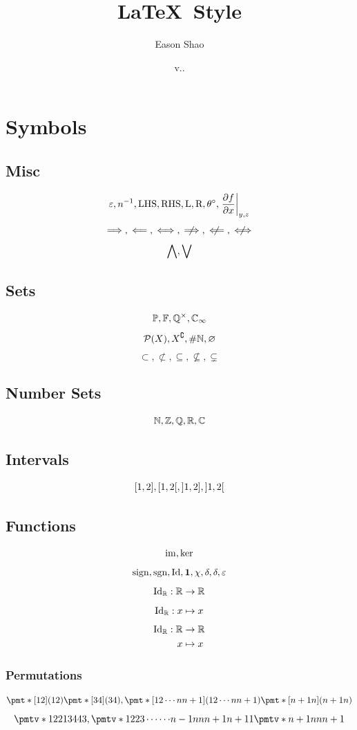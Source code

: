 \documentclass{article}
\title{\LaTeX\ Style}
\author{Eason Shao}
\date{v.\DATE.\COMMITSHA}
\begin{document}
\maketitle

\section{Symbols}
\subsection{Misc}
\[
    \varepsilon, n^{-1}, \text{LHS}, \text{RHS}, \text{L}, \text{R}, \theta^{\circ}, \left.\pdv{f}{x}\right\rvert_{y, z}
\]
\[
    \implies, \impliedby, \iff, \notimplies, \notimpliedby, \notiff
\]
\[
    \bigwedge, \bigvee
\]

\subsection{Sets}
\[
    \mathbb{P}, \mathbb{F}, \mathbb{Q}^{\times}, \mathbb{C}_{\infty}
\]
\[
    \powerset\pqty{X}, X\compl, \size\NN, \emptyset
\]
\[
    \subset, \nsubset, \subseteq, \nsubseteq, \subsetneq
\]

\subsection{Number Sets}
\[
    \mathbb{N}, \mathbb{Z}, \mathbb{Q}, \mathbb{R}, \mathbb{C}
\]

\subsection{Intervals}
\[
    \ccintv{1}{2}, \cointv{1}{2}, \ocintv{1}{2}, \oointv{1}{2}
\]

\subsection{Functions}
\[
    \operatorname{im}, \ker
\]
\[
    \operatorname{sign}, \operatorname{sgn}, \operatorname{Id}, \mathbf{1}, \chi, \delta, \delta, \varepsilon
\]
\[
    \operatorname{Id}_{\mathbb{R}}: \mathbb{R} \to \mathbb{R}
\]
\[
    \operatorname{Id}_{\mathbb{R}}: x \mapsto x
\]
\[
    \begin{aligned} \operatorname{Id}_{\mathbb{R}}: \mathbb{R} &\to \mathbb{R} \\ x &\mapsto x \end{aligned}
\]

\subsubsection{Permutations}
\[
    \perm{12} \perm{34}, \perm{{1}{2}\cdots{n}{n + 1}} \perm{{n + 1}n}
\]
\[
    \permverb{1234}{1{2} 2{1} 3{4} 4{3}}, \permverb{12{\cdots}{n - 1}{n}{n + 1}}{1{2} 2{3} \cdots{\cdots} {n - 1}{n} {n}{n + 1} {n + 1}{1}} \permverb{{n}{n + 1}}{{n + 1}{n} {n}{n + 1}}
\]
\end{document}
